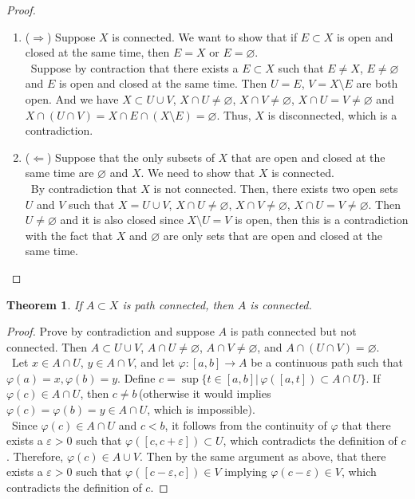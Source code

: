 \documentclass[12pt,leqno]{amsart}
\newtheorem{theorem}{Theorem}[section]
\theoremstyle{definition}
\numberwithin{equation}{subsection}
\begin{document}
\begin{proof}
~\begin{enumerate}
    \item ($\Rightarrow$) Suppose $X$ is connected. We want to show that if $E\subset X$ is open and closed at the same time, then $E = X$ or $E = \varnothing$. \\
    \hspace*{1em}\, Suppose by contraction that there exists a $E\subset X$ such that $E\neq X$, $E\neq\varnothing$ and $E$ is open and closed at the same time. Then $U = E$, $V = X\setminus E$ are both open. And we have $X \subset U\cup V$, $X\cap U \neq \varnothing$, $X\cap V \neq \varnothing$, $X\cap U = V \neq \varnothing$ and $X\cap (U\cap V) = X\cap E\cap (X\setminus E) = \varnothing$. Thus, $X$ is disconnected, which is a contradiction.
    \item ($\Leftarrow$) Suppose that the only subsets of $X$ that are open and closed at the same time are $\varnothing$ and $X$. We need to show that $X$ is connected. \\
    \hspace*{1em}\, By contradiction that $X$ is not connected. Then, there exists two open sets $U$ and $V$ such that $X = U\cup V$, $X\cap U \neq \varnothing$, $X\cap V \neq \varnothing$, $X\cap U = V \neq \varnothing$. Then $U\neq \varnothing$ and it is also closed since $X\setminus U = V$ is open, then this is a contradiction with the fact that $X$ and $\varnothing$ are only sets that are open and closed at the same time.
\end{enumerate}
\end{proof}

\medskip

\begin{theorem}
If $A\subset X$ is path connected, then $A$ is connected.
\end{theorem}
\begin{proof}
Prove by contradiction and suppose $A$ is path connected but not connected. Then $A \subset U\cup V$, $A\cap U\neq\varnothing$, $A\cap V\neq\varnothing$, and $A\cap (U\cap V)=\varnothing$. \\
\hspace*{1em}\, Let $x\in A\cap U$, $y\in A\cap V$, and let $\varphi:[a,b]\rightarrow A$ be a continuous path such that $\varphi(a) = x, \varphi(b) = y$. Define $c = \sup\{t\in[a,b]|\, \varphi\left([a,t]\right)\subset A\cap U\}$. If $\varphi(c)\in A\cap U$, then $c\neq b$\,(otherwise it would implies $\varphi(c) = \varphi(b) = y \in A\cap U$, which is impossible). \\
\hspace*{1em}\, Since $\varphi(c)\in A\cap U$ and $c<b$, it follows from the continuity of $\varphi$ that there exists a $\varepsilon > 0$ such that $\varphi\left([c,c+\varepsilon]\right)\subset U$, which contradicts the definition of $c$. Therefore, $\varphi(c)\in A\cup V$. Then by the same argument as above, that there exists a $\varepsilon>0$ such that $\varphi([c-\varepsilon,c])\in V$ implying $\varphi(c-\varepsilon)\in V$, which contradicts the definition of $c$.
\end{proof}
\end{document}
